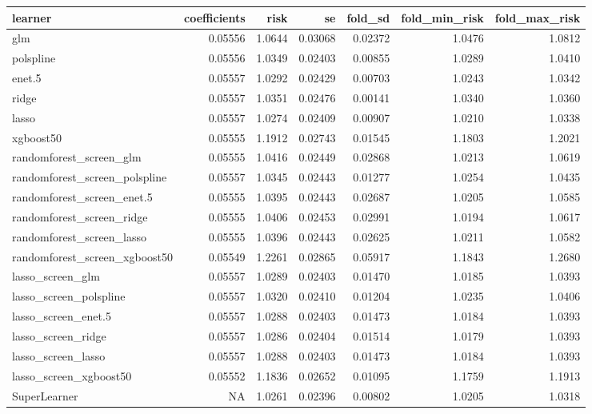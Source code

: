 \documentclass[12pt, krantz2,]{krantz}
\theoremstyle{definition}
\theoremstyle{definition}
\theoremstyle{definition}
\newcommand{\1}{\mathbbm{1}}
\begin{document}
\begin{tabular}{l|r|r|r|r|r|r}
\hline
learner & coefficients & risk & se & fold\_sd & fold\_min\_risk & fold\_max\_risk\\
\hline
glm & 0.05556 & 1.0644 & 0.03068 & 0.02372 & 1.0476 & 1.0812\\
\hline
polspline & 0.05556 & 1.0349 & 0.02403 & 0.00855 & 1.0289 & 1.0410\\
\hline
enet.5 & 0.05557 & 1.0292 & 0.02429 & 0.00703 & 1.0243 & 1.0342\\
\hline
ridge & 0.05557 & 1.0351 & 0.02476 & 0.00141 & 1.0340 & 1.0360\\
\hline
lasso & 0.05557 & 1.0274 & 0.02409 & 0.00907 & 1.0210 & 1.0338\\
\hline
xgboost50 & 0.05555 & 1.1912 & 0.02743 & 0.01545 & 1.1803 & 1.2021\\
\hline
randomforest\_screen\_glm & 0.05555 & 1.0416 & 0.02449 & 0.02868 & 1.0213 & 1.0619\\
\hline
randomforest\_screen\_polspline & 0.05557 & 1.0345 & 0.02443 & 0.01277 & 1.0254 & 1.0435\\
\hline
randomforest\_screen\_enet.5 & 0.05555 & 1.0395 & 0.02443 & 0.02687 & 1.0205 & 1.0585\\
\hline
randomforest\_screen\_ridge & 0.05555 & 1.0406 & 0.02453 & 0.02991 & 1.0194 & 1.0617\\
\hline
randomforest\_screen\_lasso & 0.05555 & 1.0396 & 0.02443 & 0.02625 & 1.0211 & 1.0582\\
\hline
randomforest\_screen\_xgboost50 & 0.05549 & 1.2261 & 0.02865 & 0.05917 & 1.1843 & 1.2680\\
\hline
lasso\_screen\_glm & 0.05557 & 1.0289 & 0.02403 & 0.01470 & 1.0185 & 1.0393\\
\hline
lasso\_screen\_polspline & 0.05557 & 1.0320 & 0.02410 & 0.01204 & 1.0235 & 1.0406\\
\hline
lasso\_screen\_enet.5 & 0.05557 & 1.0288 & 0.02403 & 0.01473 & 1.0184 & 1.0393\\
\hline
lasso\_screen\_ridge & 0.05557 & 1.0286 & 0.02404 & 0.01514 & 1.0179 & 1.0393\\
\hline
lasso\_screen\_lasso & 0.05557 & 1.0288 & 0.02403 & 0.01473 & 1.0184 & 1.0393\\
\hline
lasso\_screen\_xgboost50 & 0.05552 & 1.1836 & 0.02652 & 0.01095 & 1.1759 & 1.1913\\
\hline
SuperLearner & NA & 1.0261 & 0.02396 & 0.00802 & 1.0205 & 1.0318\\
\hline
\end{tabular}
\end{document}

